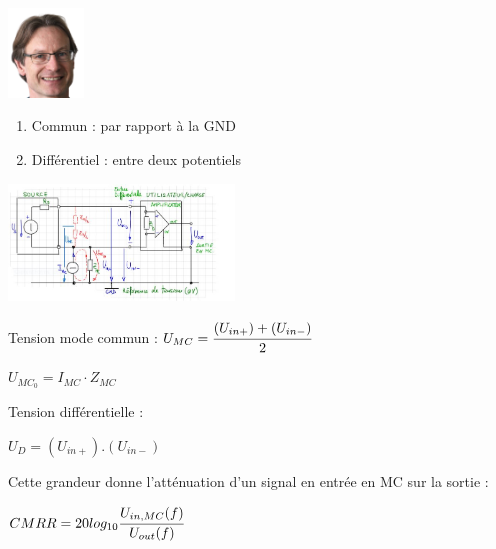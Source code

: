 
\begin{center}
    \includegraphics[width = 0.15\textwidth]{img/huitre.png}
\end{center}

\hformbar


\begin{enumerate}
    \item Commun : par rapport à la GND
    \item Différentiel : entre deux potentiels 
\end{enumerate}



\vspace{5mm}

\begin{center}
    \includegraphics[width = 0.45\textwidth]{img/Schéma.JPG}
\end{center}

Tension mode commun : 
{\hfill$ U_{MC}  = \cfrac{(U_{in+})+(U_{in-})}{2}$ \hfill}

{\hfill$ U_{MC_0}  = I_{MC} \cdot Z_{MC}$ \hfill}

Tension différentielle : 

{\hfill$ U_{D}  = (U_{in+}).(U_{in-})$ \hfill}


Cette grandeur donne l’atténuation d’un signal en entrée en MC sur la sortie :

{\hfill$ CMRR = 20log_{10}\cfrac{U_{in,MC}(f)}{U_{out}(f)}$ \hfill}

\hformbar


